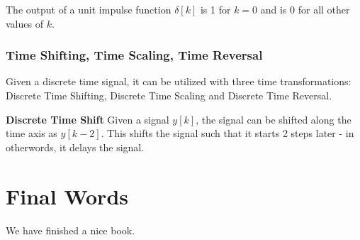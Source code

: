 \documentclass[
]{book}
\theoremstyle{definition}
\theoremstyle{definition}
\theoremstyle{definition}
\theoremstyle{remark}
\begin{document}
The output of a unit impulse function \(\delta[k]\) is 1 for \(k=0\) and is 0 for all other values of \(k\).

\hypertarget{time-shifting-time-scaling-time-reversal}{%
\subsection{Time Shifting, Time Scaling, Time Reversal}\label{time-shifting-time-scaling-time-reversal}}

Given a discrete time signal, it can be utilized with three time transformations: Discrete Time Shifting, Discrete Time Scaling and Discrete Time Reversal.

\textbf{Discrete Time Shift}
Given a signal \(y[k]\), the signal can be shifted along the time axis as \(y[k-2]\). This shifts the signal such that it starts 2 steps later - in otherwords, it delays the signal.

\hypertarget{final-words}{%
\chapter{Final Words}\label{final-words}}

We have finished a nice book.

  
\end{document}
